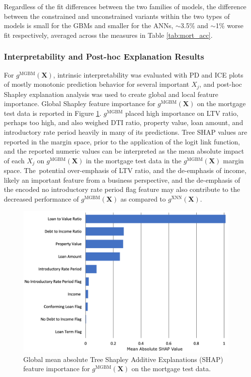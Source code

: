 \documentclass[information,article,accept,moreauthors,pdftex]{Definitions/mdpi}
\begin{document}
 Regardless of the fit differences between the two families of models, the difference between the constrained and unconstrained variants within the two types of models is small for the GBMs and smaller for the ANNs, $\sim$3.5\% and $\sim$1\% worse fit respectively, averaged across the measures in Table \ref{tab:mort_acc}.  

\subsubsection{Interpretability and Post-hoc Explanation Results}\label{ssec:int_ex_mort}

For $g^\text{MGBM}(\mathbf{X})$, intrinsic interpretability was evaluated with PD and ICE plots of mostly monotonic prediction behavior for several important $X_j$, and post-hoc Shapley explanation analysis was used to create global and local feature importance. Global Shapley feature importance for $g^\text{MGBM}(\mathbf{X})$ on the mortgage test data is reported in Figure \ref{fig:mort_mgbm_glob}. $g^\text{MGBM}$ placed high importance on LTV ratio, perhaps too high, and also weighed DTI ratio, property value, loan amount, and introductory rate period heavily in many of its predictions. Tree SHAP values are reported in the margin space, prior to the application of the logit link function, and the reported numeric values can be interpreted as the mean absolute impact of each $X_j$ on $g^\text{MGBM}(\mathbf{X})$ in the mortgage test data in the $g^\text{MGBM}(\mathbf{X})$ margin space. The~potential over-emphasis of LTV ratio, and the de-emphasis of income, likely an important feature from a business perspective, and the de-emphasis of the encoded no introductory rate period flag feature may also contribute to the decreased performance of $g^\text{MGBM}(\mathbf{X})$ as compared to $g^\text{XNN}(\mathbf{X})$.

\begin{figure}[H]
\centering
\includegraphics[width=12cm]{img/mort_mgbm_glob.png}
\caption{Global mean absolute Tree Shapley Additive Explanations (SHAP) feature importance for  $g^\text{MGBM}(\mathbf{X})$ on the mortgage test data.}
\label{fig:mort_mgbm_glob}
\end{figure} 
\end{document}
